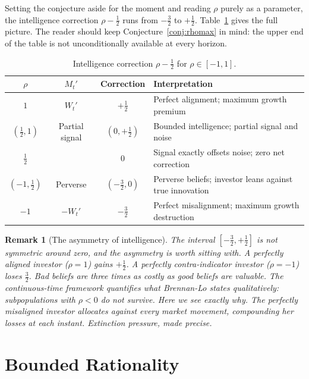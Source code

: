 \documentclass[11pt]{article}
\newtheorem{remark}{Remark}
\begin{document}
Setting the conjecture aside for the moment and reading $\rho$
purely as a parameter, the intelligence correction $\rho -
\tfrac{1}{2}$ runs from $-\tfrac{3}{2}$ to $+\tfrac{1}{2}$.
Table~\ref{tab:rho} gives the full picture. The reader should keep
Conjecture~\ref{conj:rhomax} in mind: the upper end of the table is
not unconditionally available at every horizon.

\begin{table}[ht]
\centering
\caption{Intelligence correction $\rho - \tfrac{1}{2}$ for
$\rho \in [-1, 1]$.}
\label{tab:rho}
\renewcommand{\arraystretch}{1.4}
\begin{tabular}{ccc p{7cm}}
\toprule
$\rho$ & $M_{t}'$ & Correction & Interpretation \\
\midrule
$1$ & $W_{t}'$ & $+\tfrac{1}{2}$ &
  Perfect alignment; maximum growth premium \\
$\left(\tfrac{1}{2}, 1\right)$ & Partial signal & $\left(0, +\tfrac{1}{2}\right)$ &
  Bounded intelligence; partial signal and noise \\
$\tfrac{1}{2}$ & & $0$ &
  Signal exactly offsets noise; zero net correction \\
$\left(-1, \tfrac{1}{2}\right)$ & Perverse & $\left(-\tfrac{3}{2}, 0\right)$ &
  Perverse beliefs; investor leans against true innovation \\
$-1$ & $-W_{t}'$ & $-\tfrac{3}{2}$ &
  Perfect misalignment; maximum growth destruction \\
\bottomrule
\end{tabular}
\end{table}

\begin{remark}[The asymmetry of intelligence]
The interval $[-\tfrac{3}{2}, +\tfrac{1}{2}]$ is not symmetric around
zero, and the asymmetry is worth sitting with. A perfectly aligned
investor ($\rho = 1$) gains $+\tfrac{1}{2}$. A perfectly
contra-indicator investor ($\rho = -1$) loses $\tfrac{3}{2}$. Bad
beliefs are three times as costly as good beliefs are valuable. The
continuous-time framework quantifies what Brennan-Lo states
qualitatively: subpopulations with $\rho < 0$ do not survive. Here
we see exactly why. The perfectly misaligned investor allocates
against every market movement, compounding her losses at each
instant. Extinction pressure, made precise.
\end{remark}

\section{Bounded Rationality}
\end{document}
